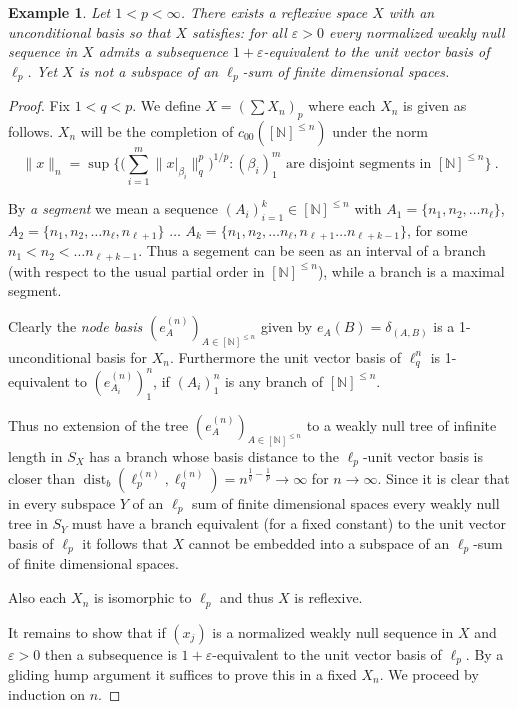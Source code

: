 \documentclass[11pt,leqno]{amsart}
\newtheorem{example}[thm]{Example}
\theoremstyle{definition}
\newcommand{\vp}{\varepsilon}
\newcommand{\dist}{\operatorname{dist}}
\newcommand{\N}{\mathbb{N}}
\begin{document}
\begin{example}\label{Ex1}
Let $1<p<\infty$. 
There exists a reflexive space $X$ with an unconditional basis so that $X$ 
satisfies:  for all $\vp >0 $ every normalized weakly null sequence in $X$ 
admits a subsequence $1+\vp$-equivalent to the unit vector basis of $\ell_p$. 
Yet $X$ is not
a subspace of an $\ell_p$-sum of finite dimensional spaces.
\end{example}

\begin{proof} 
Fix $1<q<p$. 
We define $X= (\sum X_n)_p$ where each $X_n$ is given as follows. 
$X_n$ will be the completion of $c_{00}([\N]^{\le n})$ under the norm 
$$\|x\|_n = \sup \biggl\{ \biggl( \sum_{i=1}^m \|x|_{\beta_i}\|_q^p 
\biggr)^{1/p} :(\beta_i)_1^m \text{ are disjoint segments in } [\N]^{\le n}  
\biggr\}\ .$$ 

By {\em a segment\/}  we mean a sequence $(A_i)_{i=1}^k\in [\N]^{\le n}$
with  $A_1=\{n_1,n_2,\ldots n_\ell\}$, 
$A_2=\{n_1,n_2,\ldots n_\ell,n_{\ell+1}\}$
$\ldots$ 
$A_k=\{n_1,n_2,\ldots n_\ell,n_{\ell+1}\ldots n_{\ell+k-1}\}$, 
for some 
$n_1<n_2<\ldots n_{\ell+k-1}$. Thus a segement can be seen as an interval of a
branch (with respect to the usual partial order in  $[\N]^{\le n}$), 
while a branch is a maximal segment.

Clearly the {\em node basis\/} $(e_A^{(n)})_{A\in [\N]^{\le n}}$ 
given by $e_A (B) 
= \delta_{(A,B)}$ is a 1-unconditional basis for $X_n$. 
Furthermore the unit vector basis of $\ell_q^n$ is 1-equivalent to 
$(e_{A_i}^{(n)})_1^n$, if $(A_i)_1^n$ is any branch of $[\N]^{\le n} $.

Thus no extension of the tree $(e_A^{(n)})_{A\in[\N]^{\le n}}$
to a weakly null tree of infinite length in $S_X$ has a branch whose
basis distance to the $\ell_p$-unit vector basis is closer than
$\dist_b(\ell_p^{(n)},\ell_q^{(n)})=n^{\frac1q-\frac1p}\to\infty$
for $n\to\infty$.  Since it is clear that in every subspace $Y$
of an $\ell_p$ sum of finite dimensional spaces every weakly
null tree in $S_Y$ must have a branch equivalent (for a fixed
constant) to the  unit vector basis of $\ell_p$ it follows that
$X$ cannot be embedded into 
a subspace of an $\ell_p$-sum of finite dimensional spaces.

Also each $X_n$ is isomorphic to $\ell_p$ and thus $X$ is reflexive. 

It remains to show that if $(x_j)$ is a normalized weakly null  sequence in 
$X$ and $\vp>0$ then a subsequence is $1+\vp$-equivalent to the unit vector 
basis of $\ell_p$. 
By a gliding hump argument it suffices to prove this in a fixed $X_n$. 
We proceed by induction on $n$. 


\end{proof}
\end{document}
